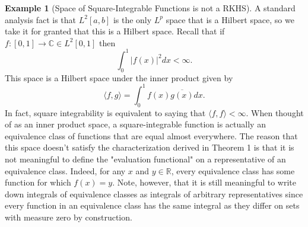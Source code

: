\documentclass[psamsfonts]{amsart}
\theoremstyle{definition}
\newtheorem{exmp}[thm]{Example}
\theoremstyle{remark}
\numberwithin{equation}{section}
\begin{document}
\begin{exmp}[Space of Square-Integrable Functions is not a RKHS]

A standard analysis fact is that $L^2[a, b]$ is the only $L^p$ space that is a Hilbert space, so we take it for granted that this is a Hilbert space. Recall that if $f : [0,1] \rightarrow \mathbb{C} \in L^2[0,1]$ then 
$$\int _0 ^1 | f(x)|^2 dx < \infty.$$
 This space is a Hilbert space under the inner product given by 
$$\langle f, g \rangle = \int _0 ^1 f(x) \overline{g(x)} dx. $$
In fact, square integrability is equivalent to saying that $\langle f, f \rangle < \infty. $ When thought of as an inner product space, a square-integrable function is actually an equivalence class of functions that are equal almost everywhere.
 The reason that this space doesn't satisfy the characterization derived in Theorem 1 is that it is not meaningful to define the "evaluation functional" on a representative of an equivalence class. Indeed, for any $x$ and $y \in \mathbb{R}$, every equivalence class has some function for which $f(x) = y$. Note, however, that it is still meaningful to write down integrals of equivalence classes as integrals of arbitrary representatives since every function in an equivalence class has the same integral as they differ on sets with measure zero by construction.
\end{exmp} 
\end{document}

